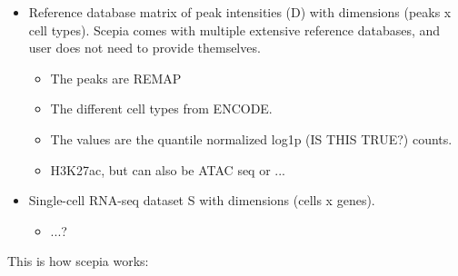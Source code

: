 \begin{itemize}
	\item Reference database matrix of peak intensities (D) with dimensions (peaks x cell types). Scepia comes with multiple extensive reference databases, and user does not need to provide themselves.
    \begin{itemize}
    \item The peaks are REMAP
    \item The different cell types from ENCODE.
    \item The values are the quantile normalized log1p (IS THIS TRUE?) counts.
    \item H3K27ac, but can also be ATAC seq or ...
    \end{itemize}
	\item Single-cell RNA-seq dataset S with dimensions (cells x genes). 
    \begin{itemize}
        \item ...?
    \end{itemize}
\end{itemize}


\noindent
This is how scepia works:

